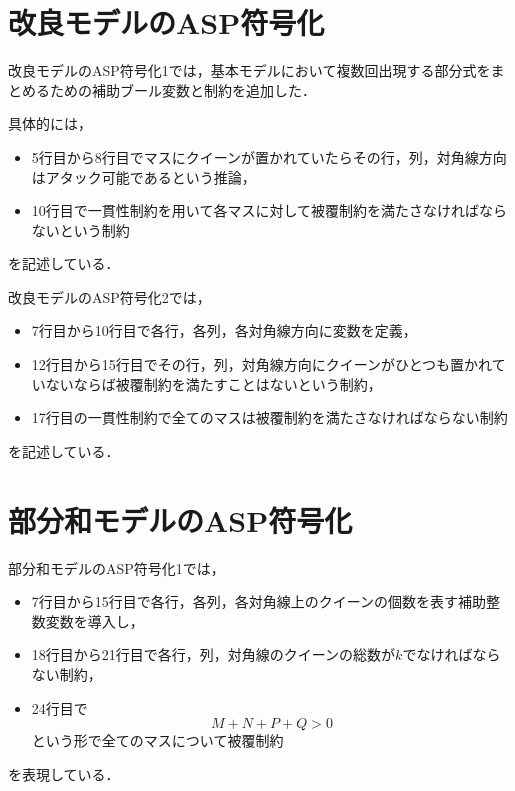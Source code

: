 \section{改良モデルのASP符号化}


改良モデルのASP符号化1では，基本モデルにおいて複数回出現する部分式をまとめるための補助ブール変数と制約を追加した．\par
具体的には，\begin{itemize}
	     \item 5行目から8行目でマスにクイーンが置かれていたらその行，列，対角線方向はアタック可能であるという推論，
	     \item 10行目で一貫性制約を用いて各マスに対して被覆制約を満たさなければならないという制約
	    \end{itemize}
を記述している．



\newpage
改良モデルのASP符号化2では，
\begin{itemize}
 \item 7行目から10行目で各行，各列，各対角線方向に変数を定義，
 \item 12行目から15行目でその行，列，対角線方向にクイーンがひとつも置かれていないならば被覆制約を満たすことはないという制約，
 \item 17行目の一貫性制約で全てのマスは被覆制約を満たさなければならない制約
\end{itemize}
を記述している．
\newpage
\section{部分和モデルのASP符号化}



部分和モデルのASP符号化1では，
\begin{itemize}
 \item 7行目から15行目で各行，各列，各対角線上のクイーンの個数を表す補助整数変数を導入し，
 \item 18行目から21行目で各行，列，対角線のクイーンの総数が$k$でなければならない制約， 
 \item 24行目で\[
													  M+N+P+Q>0   
													 \]
という形で全てのマスについて被覆制約
\end{itemize}
を表現している．

